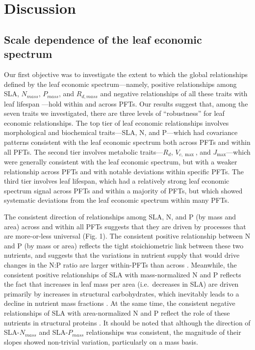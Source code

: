 \documentclass{article}
\begin{document}
\section{Discussion}

\subsection{Scale dependence of the leaf economic spectrum}

Our first objective was to investigate the extent to which the global relationships defined by the leaf economic spectrum---namely, positive relationships among SLA, $N_{mass}$, $P_{mass}$, and $R_{d,mass}$ and negative relationships of all these traits with leaf lifespan \citep{wright_2004_worldwide,shipley_2006_fundamental,reich_2014_world,diaz_2015_global} ---hold within and across PFTs.
Our results suggest that, among the seven traits we investigated, there are three levels of ``robustness'' for leaf economic relationships.
The top tier of leaf economic relationships involves morphological and biochemical traits---SLA, N, and P---which had covariance patterns consistent with the leaf economic spectrum both across PFTs and within all PFTs.
The second tier involves metabolic traits---$R_d$, $V_{c,\max}$, and $J_{\max}$---which were generally consistent with the leaf economic spectrum, but with a weaker relationship across PFTs and with notable deviations within specific PFTs.
The third tier involves leaf lifespan, which had a relatively strong leaf economic spectrum signal across PFTs and within a majority of PFTs,
but which showed systematic deviations from the leaf economic spectrum within many PFTs.

The consistent direction of relationships among SLA, N, and P (by mass and area) across and within all PFTs suggests that they are driven by processes that are more-or-less universal (Fig. 1).
The consistent positive relationship between N and P (by mass or area) reflects the tight stoichiometric link between these two nutrients, and suggests that the variations in nutrient supply that would drive changes in the N:P ratio are larger within-PFTs than across \citep{elser_2010_biological}.
Meanwhile, the consistent positive relationships of SLA with mass-normalized N and P reflects the fact that increases in leaf mass per area (i.e.\ decreases in SLA) are driven primarily by increases in structural carbohydrates, which inevitably leads to a decline in nutrient mass fractions \citep{poorter_2009_causes}.
At the same time, the consistent negative relationships of SLA with area-normalized N and P reflect the role of these nutrients in structural proteins \citep{onoda_2017_physiological}.
It should be noted that although the direction of SLA-$N_{mass}$ and SLA-$P_{mass}$ relationships was consistent, the magnitude of their slopes showed non-trivial variation, particularly on a mass basis.
\end{document}
